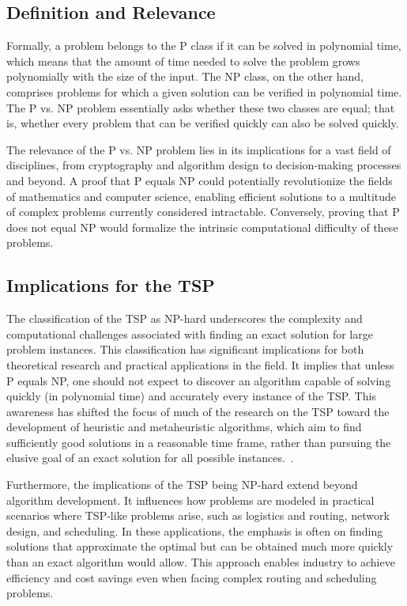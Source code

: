 \subsection{Definition and Relevance}

Formally, a problem belongs to the \Gls{P} class if it can be solved in polynomial time, which means that the amount of time needed to solve the problem grows polynomially with the size of the input. The \Gls{NP} class, on the other hand, comprises problems for which a given solution can be verified in polynomial time. The \Gls{P} vs. \Gls{NP} problem essentially asks whether these two classes are equal; that is, whether every problem that can be verified quickly can also be solved quickly.

The relevance of the \Gls{P} vs. \Gls{NP} problem lies in its implications for a vast field of disciplines, from cryptography and algorithm design to decision-making processes and beyond. A proof that \Gls{P} equals \Gls{NP} could potentially revolutionize the fields of mathematics and computer science, enabling efficient solutions to a multitude of complex problems currently considered intractable. Conversely, proving that \Gls{P} does not equal \Gls{NP} would formalize the intrinsic computational difficulty of these problems.

\subsection{Implications for the \Gls{TSP}}

The classification of the \Gls{TSP} as \Gls{NP}-hard underscores the complexity and computational challenges associated with finding an exact solution for large problem instances. This classification has significant implications for both theoretical research and practical applications in the field. It implies that unless \Gls{P} equals \Gls{NP}, one should not expect to discover an algorithm capable of solving quickly (in polynomial time) and accurately every instance of the \Gls{TSP}. This awareness has shifted the focus of much of the research on the \Gls{TSP} toward the development of heuristic and metaheuristic algorithms, which aim to find sufficiently good solutions in a reasonable time frame, rather than pursuing the elusive goal of an exact solution for all possible instances.~\cite{Karp1972}.

Furthermore, the implications of the \Gls{TSP} being \Gls{NP}-hard extend beyond algorithm development. It influences how problems are modeled in practical scenarios where TSP-like problems arise, such as logistics and routing, network design, and scheduling. In these applications, the emphasis is often on finding solutions that approximate the optimal but can be obtained much more quickly than an exact algorithm would allow. This approach enables industry to achieve efficiency and cost savings even when facing complex routing and scheduling problems.

